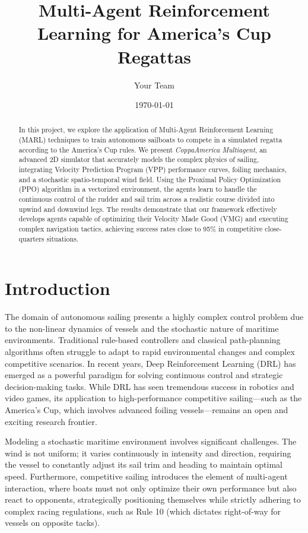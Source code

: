 \documentclass{article}
\title{Multi-Agent Reinforcement Learning for America's Cup Regattas}
\author{Your Team}
\date{\today}
\begin{document}
\maketitle

\begin{abstract}
In this project, we explore the application of Multi-Agent Reinforcement Learning (MARL) techniques to train autonomous sailboats to compete in a simulated regatta according to the America's Cup rules. We present \textit{CoppaAmerica Multiagent}, an advanced 2D simulator that accurately models the complex physics of sailing, integrating Velocity Prediction Program (VPP) performance curves, foiling mechanics, and a stochastic spatio-temporal wind field. Using the Proximal Policy Optimization (PPO) algorithm in a vectorized environment, the agents learn to handle the continuous control of the rudder and sail trim across a realistic course divided into upwind and downwind legs. The results demonstrate that our framework effectively develops agents capable of optimizing their Velocity Made Good (VMG) and executing complex navigation tactics, achieving success rates close to 95\% in competitive close-quarters situations.
\end{abstract}

\section{Introduction}
The domain of autonomous sailing presents a highly complex control problem due to the non-linear dynamics of vessels and the stochastic nature of maritime environments. Traditional rule-based controllers and classical path-planning algorithms often struggle to adapt to rapid environmental changes and complex competitive scenarios. In recent years, Deep Reinforcement Learning (DRL) has emerged as a powerful paradigm for solving continuous control and strategic decision-making tasks. While DRL has seen tremendous success in robotics and video games, its application to high-performance competitive sailing—such as the America's Cup, which involves advanced foiling vessels—remains an open and exciting research frontier.

Modeling a stochastic maritime environment involves significant challenges. The wind is not uniform; it varies continuously in intensity and direction, requiring the vessel to constantly adjust its sail trim and heading to maintain optimal speed. Furthermore, competitive sailing introduces the element of multi-agent interaction, where boats must not only optimize their own performance but also react to opponents, strategically positioning themselves while strictly adhering to complex racing regulations, such as Rule 10 (which dictates right-of-way for vessels on opposite tacks).
\end{document}
